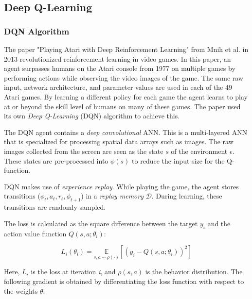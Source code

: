 


\newpage
\subsection{Deep Q-Learning}


\subsubsection{DQN Algorithm}



The paper "Playing Atari with Deep Reinforcement Learning" \cite{Atari_DQN_2013} from Mnih et al. in 2013 revolutionized reinforcement learning in video games. In this paper, an agent surpasses humans on the Atari console from 1977 on multiple games by performing actions while observing the video images of the game. The same raw input, network architecture, and parameter values are used in each of the 49 Atari games. By learning a different policy for each game the agent learns to play at or beyond the skill level of humans on many of these games. The paper used its own \textit{Deep Q-Learning} (DQN) algorithm to achieve this.



The DQN agent contains a \textit{deep convolutional} ANN. This is a multi-layered ANN that is specialized for processing spatial data arrays such as images. The raw images collected from the screen are seen as the state $s$ of the environment $\epsilon$. These states are pre-processed into $\phi(s)$ to reduce the input size for the Q-function.

DQN makes use of \textit{experience replay}. While playing the game, the agent stores transitions ($\phi_t, a_t, r_t, \phi_{t+1}$) in a \textit{replay memory} $\mathcal{D}$. During learning, these transitions are randomly sampled. 


The loss is calculated as the square difference between the target $y_i$ and the action value function $Q(s,a;\theta_i)$:

\begin{equation}
    L_i(\theta_i) = \underset{s,a \sim  \rho(\cdot)}{\mathbb{E}} [(y_i - Q(s,a;\theta_i))^2]
\end{equation}

Here, $L_i$ is the loss at iteration \textit{i}, and $\rho(s,a)$ is the behavior distribution. The following gradient is obtained by differentiating the loss function with respect to the weights $\theta$:

